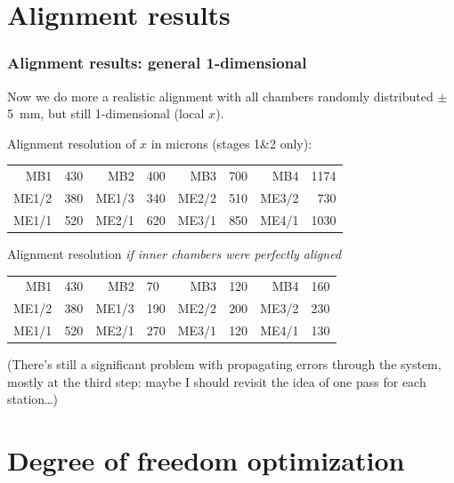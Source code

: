 \documentclass[compress]{beamer}
\begin{document}
\section*{Alignment results}

\begin{frame}
\frametitle{Alignment results: general 1-dimensional}

Now we do more a realistic alignment with all chambers randomly
distributed $\pm$5~mm, but still 1-dimensional (local $x$).

\vspace{0.25 cm}
Alignment resolution of $x$ in microns (stages 1\&2 only):

\begin{tabular}{r l r l r l r l}
MB1 & 430 & MB2 & 400 & MB3 & 700 & MB4 & 1174 \\
ME1/2 & 380 & ME1/3 & 340 & ME2/2 & 510 & ME3/2 & \textcolor{white}{0}730 \\
ME1/1 & 520 & ME2/1 & 620 & ME3/1 & 850 & ME4/1 & 1030 \\
\end{tabular}

\vspace{0.5 cm}
Alignment resolution {\it if inner chambers were perfectly aligned}

\begin{tabular}{r l r l r l r l}
MB1 & 430 & MB2 & 70 & MB3 & 120 & MB4 & 160 \\
ME1/2 & 380 & ME1/3 & 190 & ME2/2 & 200 & ME3/2 & 230 \\
ME1/1 & 520 & ME2/1 & 270 & ME3/1 & 120 & ME4/1 & 130 \\
\end{tabular}

\vspace{0.25 cm} (There's still a significant problem with propagating
errors through the system, mostly at the third step: maybe I should
revisit the idea of one pass for each station\ldots)
\end{frame}

\section*{Degree of freedom optimization}
\end{document}
